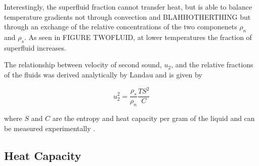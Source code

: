 Interestingly, the superfluid fraction cannot transfer heat, but is
able to balance temperature gradients not through convection and
BLAHHOTHERTHING but through an exchange of the relative concentrations
of the two componenets $\rho_n$ and $\rho_s$. As seen in FIGURE
TWOFLUID, at lower temperatures the fraction of superfluid increases.

The relationship between velocity of second sound, $u_2$, and the
relative fractions of the fluids was derived analytically by Landau
and is given by

\begin{equation}
u_2^2 = \frac{\rho_s}{\rho_n}\frac{T S^2}{C}
\end{equation}

where $S$ and $C$ are the entropy and heat capacity per gram of the
liquid and can be measured experimentally \cite{atkins}. 

\subsection{Heat Capacity}
